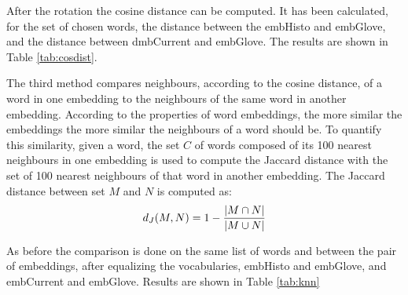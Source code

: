 \documentclass[runningheads]{llncs}
\begin{document}
After the rotation the cosine distance can be computed. It has been calculated, for the set of chosen words, the distance between the embHisto and embGlove, and the distance between dmbCurrent and embGlove. The results are shown in Table \ref{tab:cosdist}.

The third method compares neighbours, according to the cosine distance, of a word in one embedding to the neighbours of the same word in another embedding. According to the properties of word embeddings, the more similar the embeddings the more similar the neighbours of a word should be. To quantify this similarity, given a word, the set $C$ of words composed of its 100 nearest neighbours in one embedding is used to compute the Jaccard distance with the set of 100 nearest neighbours of that word in another embedding. The Jaccard distance between set $M$ and $N$ is computed as:
\begin{align*}
d_J(M,N) = 1 - { |M \cap N| \over |M \cup N| }
\end{align*}

As before the comparison is done on the same list of words and between the pair of embeddings, after equalizing the vocabularies, embHisto and embGlove, and embCurrent and embGlove. Results are shown in Table \ref{tab:knn}
\end{document}
